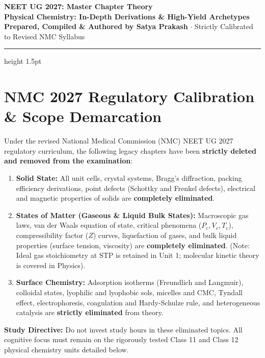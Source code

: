 \documentclass[10pt,a4paper]{article}
\begin{document}
\begin{center}
  {\Huge \textbf{NEET UG 2027: Master Chapter Theory}}\\[6pt]
  {\Large \textbf{Physical Chemistry: In-Depth Derivations \& High-Yield Archetypes}}\\[4pt]
  {\small \textbf{Prepared, Compiled \& Authored by Satya Prakash} $\cdot$ Strictly Calibrated to Revised NMC Syllabus}
  \vspace{4pt}
  \hrule height 1.5pt
\end{center}

\section{NMC 2027 Regulatory Calibration \& Scope Demarcation}

\begin{trapbox}
Under the revised National Medical Commission (NMC) NEET UG 2027 regulatory curriculum, the following legacy chapters have been \textbf{strictly deleted and removed from the examination}:
\begin{enumerate}
  \item \textbf{Solid State:} All unit cells, crystal systems, Bragg's diffraction, packing efficiency derivations, point defects (Schottky and Frenkel defects), electrical and magnetic properties of solids are \textbf{completely eliminated}.
  \item \textbf{States of Matter (Gaseous \& Liquid Bulk States):} Macroscopic gas laws, van der Waals equation of state, critical phenomena ($P_c, V_c, T_c$), compressibility factor ($Z$) curves, liquefaction of gases, and bulk liquid properties (surface tension, viscosity) are \textbf{completely eliminated}. (Note: Ideal gas stoichiometry at STP is retained in Unit 1; molecular kinetic theory is covered in Physics).
  \item \textbf{Surface Chemistry:} Adsorption isotherms (Freundlich and Langmuir), colloidal states, lyophilic and lyophobic sols, micelles and CMC, Tyndall effect, electrophoresis, coagulation and Hardy-Schulze rule, and heterogeneous catalysis are \textbf{strictly eliminated} from theory.
\end{enumerate}
\textbf{Study Directive:} Do not invest study hours in these eliminated topics. All cognitive focus must remain on the rigorously tested Class 11 and Class 12 physical chemistry units detailed below.
\end{trapbox}
\end{document}
